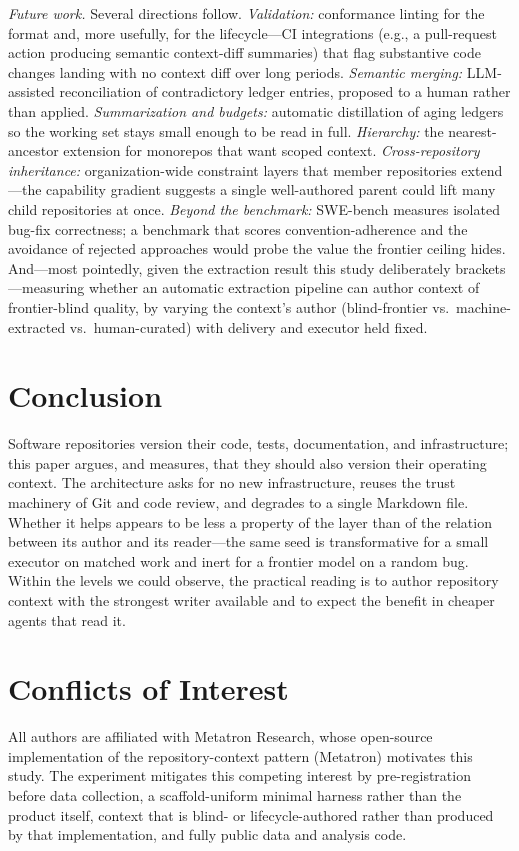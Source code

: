 \documentclass[sigconf,screen]{acmart}
\begin{document}
\emph{Future work.} Several directions follow. \emph{Validation:} conformance
linting for the format and, more usefully, for the lifecycle---CI integrations
(e.g., a pull-request action producing semantic context-diff summaries) that flag
substantive code changes landing with no context diff over long periods.
\emph{Semantic merging:} LLM-assisted reconciliation of contradictory ledger
entries, proposed to a human rather than applied. \emph{Summarization and
budgets:} automatic distillation of aging ledgers so the working set stays small
enough to be read in full. \emph{Hierarchy:} the nearest-ancestor extension for
monorepos that want scoped context. \emph{Cross-repository inheritance:}
organization-wide constraint layers that member repositories extend---the
capability gradient suggests a single well-authored parent could lift many
child repositories at once. \emph{Beyond the benchmark:} SWE-bench measures
isolated bug-fix correctness; a benchmark that scores convention-adherence and the
avoidance of rejected approaches would probe the value the frontier ceiling hides.
And---most pointedly, given the extraction result this study deliberately
brackets---measuring whether an automatic extraction pipeline can author context
of frontier-blind quality, by varying the context's author (blind-frontier vs.\
machine-extracted vs.\ human-curated) with delivery and executor held fixed.

\section{Conclusion}
Software repositories version their code, tests, documentation, and
infrastructure; this paper argues, and measures, that they should also version
their operating context. The architecture asks for no new infrastructure, reuses
the trust machinery of Git and code review, and degrades to a single Markdown
file. Whether it helps appears to be less a property of the layer than of the
relation between its author and its reader---the same seed is transformative for a
small executor on matched work and inert for a frontier model on a random bug.
Within the levels we could observe, the practical reading is to author repository
context with the strongest writer available and to expect the benefit in cheaper
agents that read it.

\section*{Conflicts of Interest}
All authors are affiliated with Metatron Research, whose open-source
implementation of the repository-context pattern (Metatron) motivates this study.
The experiment mitigates this competing interest by pre-registration before data
collection, a scaffold-uniform minimal harness rather than the product itself,
context that is blind- or lifecycle-authored rather than produced by that
implementation, and fully public data and analysis code.
\end{document}
